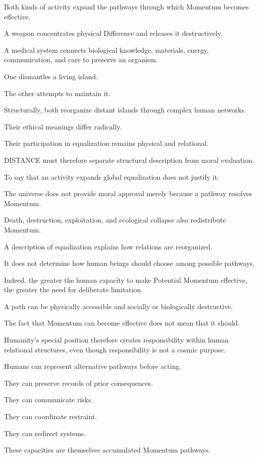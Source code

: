 Both kinds of activity expand the pathways through which Momentum becomes effective.

A weapon concentrates physical Difference and releases it destructively.

A medical system connects biological knowledge, materials, energy, communication, and care to preserve an organism.

One dismantles a living island.

The other attempts to maintain it.

Structurally, both reorganize distant islands through complex human networks.

Their ethical meanings differ radically.

Their participation in equalization remains physical and relational.

DISTANCE must therefore separate structural description from moral evaluation.

To say that an activity expands global equalization does not justify it.

The universe does not provide moral approval merely because a pathway resolves Momentum.

Death, destruction, exploitation, and ecological collapse also redistribute Momentum.

A description of equalization explains how relations are reorganized.

It does not determine how human beings should choose among possible pathways.

Indeed, the greater the human capacity to make Potential Momentum effective, the greater the need for deliberate limitation.

A path can be physically accessible and socially or biologically destructive.

The fact that Momentum can become effective does not mean that it should.

Humanity’s special position therefore creates responsibility within human relational structures, even though responsibility is not a cosmic purpose.

Humans can represent alternative pathways before acting.

They can preserve records of prior consequences.

They can communicate risks.

They can coordinate restraint.

They can redirect systems.

These capacities are themselves accumulated Momentum pathways.

